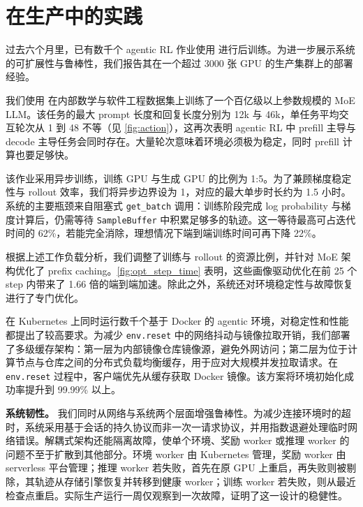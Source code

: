 \section{\SystemName{} 在生产中的实践}
\label{sec:large-scale-analysis}

过去六个月里，已有数千个 agentic RL 作业使用 \SystemName{} 进行后训练。为进一步展示系统的可扩展性与鲁棒性，我们报告其在一个超过 3000 张 GPU 的生产集群上的部署经验。

我们使用 \SystemName{} 在内部数学与软件工程数据集上训练了一个百亿级以上参数规模的 MoE LLM。该任务的最大 prompt 长度和回复长度分别为 12k 与 46k，单任务平均交互轮次从 1 到 48 不等（见 \autoref{fig:action}），这再次表明 agentic RL 中 prefill 主导与 decode 主导任务会同时存在。大量轮次意味着环境必须极为稳定，同时 prefill 计算也要足够快。

该作业采用异步训练，训练 GPU 与生成 GPU 的比例为 1:5。为了兼顾梯度稳定性与 rollout 效率，我们将异步边界设为 1，对应的最大单步时长约为 1.5 小时。系统的主要瓶颈来自阻塞式 \texttt{get\_batch} 调用：训练阶段完成 log probability 与梯度计算后，仍需等待 \texttt{SampleBuffer} 中积累足够多的轨迹。这一等待最高可占迭代时间的 62\%，若能完全消除，理想情况下端到端训练时间可再下降 22\%。

根据上述工作负载分析，我们调整了训练与 rollout 的资源比例，并针对 MoE 架构优化了 prefix caching。\autoref{fig:opt_step_time} 表明，这些画像驱动优化在前 25 个 step 内带来了 1.66 倍的端到端加速。除此之外，系统还对环境稳定性与故障恢复进行了专门优化。

在 Kubernetes 上同时运行数千个基于 Docker 的 agentic 环境，对稳定性和性能都提出了较高要求。为减少 \texttt{env.reset} 中的网络抖动与镜像拉取开销，我们部署了多级缓存架构：第一层为内部镜像仓库镜像源，避免外网访问；第二层为位于计算节点与仓库之间的分布式负载均衡缓存，用于应对大规模并发拉取请求。在 \texttt{env.reset} 过程中，客户端优先从缓存获取 Docker 镜像。该方案将环境初始化成功率提升到 99.99\% 以上。

\noindent\textbf{系统韧性。}
我们同时从网络与系统两个层面增强鲁棒性。为减少连接环境时的超时，系统采用基于会话的持久协议而非一次一请求协议，并用指数退避处理临时网络错误。解耦式架构还能隔离故障，使单个环境、奖励 worker 或推理 worker 的问题不至于扩散到其他部分。环境 worker 由 Kubernetes 管理，奖励 worker 由 serverless 平台管理；推理 worker 若失败，首先在原 GPU 上重启，再失败则被剔除，其轨迹从存储引擎恢复并转移到健康 worker；训练 worker 若失败，则从最近检查点重启。实际生产运行一周仅观察到一次故障，证明了这一设计的稳健性。
